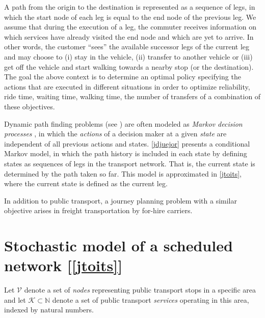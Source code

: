 \documentclass[dissertation,draft*]{aaltoseries}
\begin{document}
A path from the origin to the
destination is represented as a sequence of legs, in which the start node of
each leg is equal to the end node of the previous leg.
We assume that during the execution of a leg, 
the commuter receives information on which
services have already visited the end node %
and which are yet to arrive.
In other words, the customer ``sees'' the available successor legs of the current leg
and may choose to (i) stay in the vehicle, %
(ii) transfer to another vehicle or (iii) get off the vehicle and start
walking towards a nearby stop (or the destination).
The goal the above context is to determine an optimal policy specifying the actions
that are executed in different situations in order to 
optimize reliability, ride time, waiting time, walking time, the number of transfers
of a combination of these objectives.

Dynamic path finding problems (see \cite{hall,bander2002,fu1998,miller-hooks2000,davies,kim2005a,kim2005b,azaron,ferris,thomas,waller}) are often modeled
as \emph{Markov decision processes} \cite{psaraftis93,polychronopoulos}, in which the 
\emph{actions} of a decision maker at a given \emph{state} are independent of all previous actions and states.
\ref{jdjuejor} presents a conditional Markov model, in which the path history is included in each state by
defining states as sequences of legs in the transport network.
That is, the current state is determined by the path taken so far.
This model is approximated in \ref{jtoits}, where the current state is defined as the current leg.


In addition to public transport, a journey planning problem with a similar objective 
arises in freight transportation by for-hire carriers. 


\section{Stochastic model of a scheduled network [\ref{jtoits}]}
Let $\mathcal{V}$ denote a set of \emph{nodes} representing public transport stops
in a specific area and let $\mathcal{K} \subset \mathbb{N}$ denote a set of public 
transport \emph{services} operating in this area, indexed by natural numbers. 
\end{document}
